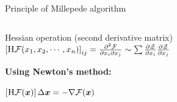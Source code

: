 \documentclass{ikpKoeln}
\begin{document}
\begin{frame}[t]{Principle of Millepede algorithm}
	\vspace*{-0.9em}
	\begin{columns}[t]
		\begin{column}{0.5 \textwidth}
			\begin{block}{\small Hessian operation (second derivative matrix)}
				\centering
				$\left[\textsc{H} \mathcal{F}(x_1, x_2, \cdots, x_n)\right]_{ij} = \frac{\partial^2\mathcal{F}}{\partial x_i \partial x_j} \sim \sum\frac{\partial \mathcal{Z}}{\partial x_i}\frac{\partial \mathcal{Z}}{\partial x_j}$
			\end{block}
			\textbf{\small Using Newton's method:}
			\begin{center}
				$\left[\textsc{H} \mathcal{F}(\boldsymbol{x})\right]\Delta\boldsymbol{x} = - \nabla \mathcal{F}(\boldsymbol{x})$
			\end{center}
			\hspace{3pt}
\end{column}
\end{columns}
\end{frame}
\end{document}
